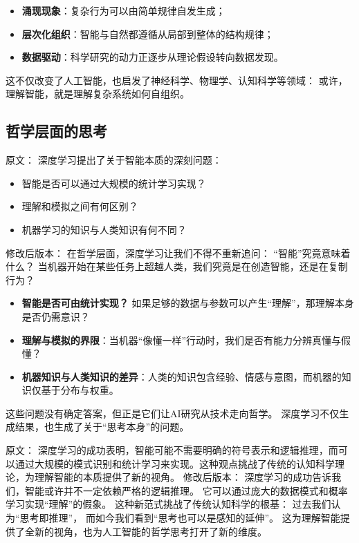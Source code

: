 \begin{itemize}
\item \textbf{涌现现象}：复杂行为可以由简单规律自发生成；
\item \textbf{层次化组织}：智能与自然都遵循从局部到整体的结构规律；
\item \textbf{数据驱动}：科学研究的动力正逐步从理论假设转向数据发现。
\end{itemize}

这不仅改变了人工智能，也启发了神经科学、物理学、认知科学等领域：  
或许，理解智能，就是理解复杂系统如何自组织。



\subsection{哲学层面的思考}

原文：
深度学习提出了关于智能本质的深刻问题：

\begin{itemize}
\item 智能是否可以通过大规模的统计学习实现？
\item 理解和模拟之间有何区别？
\item 机器学习的知识与人类知识有何不同？
\end{itemize}
修改后版本：
在哲学层面，深度学习让我们不得不重新追问：  
“智能”究竟意味着什么？  
当机器开始在某些任务上超越人类，我们究竟是在创造智能，还是在复制行为？  

\begin{itemize}
\item \textbf{智能是否可由统计实现？}  
如果足够的数据与参数可以产生“理解”，那理解本身是否仍需意识？
\item \textbf{理解与模拟的界限}：当机器“像懂一样”行动时，我们是否有能力分辨真懂与假懂？
\item \textbf{机器知识与人类知识的差异}：人类的知识包含经验、情感与意图，而机器的知识仅基于分布与权重。
\end{itemize}

这些问题没有确定答案，但正是它们让AI研究从技术走向哲学。  
深度学习不仅生成结果，也生成了关于“思考本身”的问题。



原文：
深度学习的成功表明，智能可能不需要明确的符号表示和逻辑推理，而可以通过大规模的模式识别和统计学习来实现。这种观点挑战了传统的认知科学理论，为理解智能的本质提供了新的视角。
修改后版本：
深度学习的成功告诉我们，智能或许并不一定依赖严格的逻辑推理。  
它可以通过庞大的数据模式和概率学习实现“理解”的假象。  
这种新范式挑战了传统认知科学的根基：  
过去我们认为“思考即推理”，  
而如今我们看到“思考也可以是感知的延伸”。  
这为理解智能提供了全新的视角，也为人工智能的哲学思考打开了新的维度。



